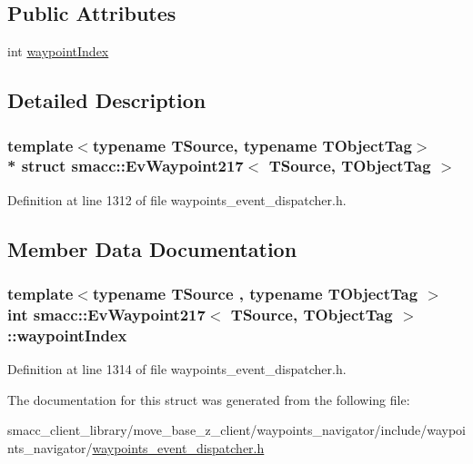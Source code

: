 \subsection*{Public Attributes}
\begin{DoxyCompactItemize}
\item 
int \hyperlink{structsmacc_1_1EvWaypoint217_a074e14a056b95bdba78435fe9e1eabfe}{waypoint\+Index}
\end{DoxyCompactItemize}


\subsection{Detailed Description}
\subsubsection*{template$<$typename T\+Source, typename T\+Object\+Tag$>$\\*
struct smacc\+::\+Ev\+Waypoint217$<$ T\+Source, T\+Object\+Tag $>$}



Definition at line 1312 of file waypoints\+\_\+event\+\_\+dispatcher.\+h.



\subsection{Member Data Documentation}
\subsubsection[{\texorpdfstring{waypoint\+Index}{waypointIndex}}]{\setlength{\rightskip}{0pt plus 5cm}template$<$typename T\+Source , typename T\+Object\+Tag $>$ int {\bf smacc\+::\+Ev\+Waypoint217}$<$ T\+Source, T\+Object\+Tag $>$\+::waypoint\+Index}\hypertarget{structsmacc_1_1EvWaypoint217_a074e14a056b95bdba78435fe9e1eabfe}{}\label{structsmacc_1_1EvWaypoint217_a074e14a056b95bdba78435fe9e1eabfe}


Definition at line 1314 of file waypoints\+\_\+event\+\_\+dispatcher.\+h.



The documentation for this struct was generated from the following file\+:\begin{DoxyCompactItemize}
\item 
smacc\+\_\+client\+\_\+library/move\+\_\+base\+\_\+z\+\_\+client/waypoints\+\_\+navigator/include/waypoints\+\_\+navigator/\hyperlink{waypoints__event__dispatcher_8h}{waypoints\+\_\+event\+\_\+dispatcher.\+h}\end{DoxyCompactItemize}
